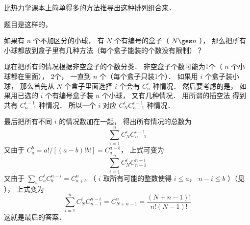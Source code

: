 
比热力学课本上简单得多的方法推导出这种排列组合来．

题目是这样的， 

如果有 $n$ 个不加区分的小球， 有 $N$ 个有编号的盒子（ $N \ges n$ ）， 那么把所有小球都放到盒子里有几种方法（每个盒子能装的个数没有限制）？

现在把所有的情况根据非空盒子的个数分类． 非空盒子个数可能为1个（ $n$ 个小球都在里面）， 2个， 一直到 $n$ 个（每个盒子只装1个）． 如果用 $i$ 个盒子装小球， 那么首先从 $N$ 个盒子里面选择 $i$ 个会有 $C_n^i$ 种情况． 然后要考虑的是， 如果用已选的 $i$ 个有编号盒子装 $n$ 个小球， 又有几种情况． 用所谓的插空法%
得到共有 $C_{n-1}^{i-1}$ 种情况． 所以一个 $i$ 对应 $C_N^i C_{n-1}^{i-1}$ 种情况．

最后把所有不同 $i$ 的情况数加在一起， 得出所有情况的总数为
\begin{equation}
\sum_{i = 1}^n C_N^i C_{n-1}^{i-1}
\end{equation}
又由于 $C_a^b = a!/[(a-b)!b!] = C_a^{a-b}$， 上式可变为
\begin{equation}
\sum_{i=1}^n  C_N^i C_{n-1}^{n-i}
\end{equation}
又由于 $\sum_i C_a^i C_b^{n-i} = C_{a+b}^n$ （ $i$ 取所有可能的整数使得 $i \leqslant a$，  $n - i \leqslant b$  ）（见%
）， 上式变为
\begin{equation}
\sum_{i=1}^n C_N^i C_{n-1}^{n-i} = C_{N+n-1}^n = \frac{(N+n-1)!}{n!(N - 1)!}
\end{equation}
这就是最后的答案．

